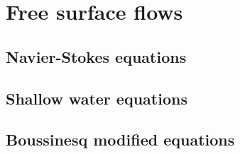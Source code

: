 
\chapter{Free surface flows}


\section{Navier-Stokes equations}


\section{Shallow water equations}


\section{Boussinesq modified equations}


